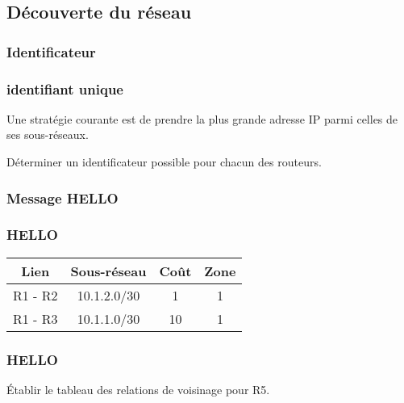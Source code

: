 \documentclass[svgnames,11pt]{beamer}
\begin{document}
\subsection{Découverte du réseau}
\subsubsection{Identificateur}
\begin{frame}
    \frametitle{identifiant unique}

    Une stratégie courante est de prendre la plus grande adresse IP parmi celles de ses sous-réseaux.
\begin{activite}
Déterminer un identificateur possible pour chacun des routeurs.
\end{activite}

\end{frame}

\subsubsection{Message HELLO}
\begin{frame}
    \frametitle{HELLO}

    \begin{center}
        \begin{tabular}{|*{4}{c|}}
            \hline
            Lien & Sous-réseau & Coût & Zone \\
            \hline
            R1 - R2 & 10.1.2.0/30 & 1 & 1 \\
            \hline
            R1 - R3 & 10.1.1.0/30 & 10 & 1 \\
            \hline
        \end{tabular}
    \end{center}

\end{frame}

\begin{frame}
    \frametitle{HELLO}

    \begin{activite}
        Établir le tableau des relations de voisinage pour R5.
        \end{activite}

\end{frame}
\end{document}
